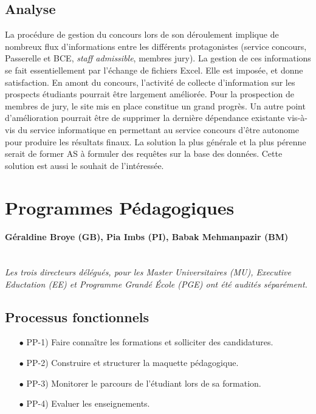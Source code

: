 \documentclass{book}
\begin{document}
\subsection{Analyse}

La procédure de gestion du concours lors de son déroulement
implique de nombreux flux d'informations entre les différents
protagonistes (service concours, Passerelle et BCE, \textit{staff 
admissible}, membres jury). La gestion de ces informations se fait
essentiellement par l'échange de fichiers Excel. Elle est imposée,
et donne satisfaction.
En amont du concours, l'activité de collecte d'information sur les
prospects étudiants pourrait être largement améliorée. Pour la
prospection de membres de jury, le site mis en place constitue un
grand progrès.
Un autre point d'amélioration pourrait être de supprimer la dernière
dépendance existante vis-à-vis du service informatique en permettant
au service concours d'être autonome pour produire les résultats finaux.
La solution la plus générale et la plus pérenne serait de former AS à 
formuler des requêtes sur la base des données. Cette solution est aussi
le souhait de l'intéressée.



\section{Programmes Pédagogiques}
\paragraph{
Géraldine Broye (GB), %
Pia Imbs (PI),
Babak Mehmanpazir (BM)} 
~\\

\textit{Les trois directeurs délégués, pour les Master Universitaires (MU), 
Executive Eductation (EE) et Programme Grandé \'Ecole (PGE) ont été audités 
séparément.}

\subsection{Processus fonctionnels}
\label{sc:pp-process}

\begin{itemize}
\item[$\bullet$] PP-1) Faire connaître les formations et solliciter des candidatures.
\item[$\bullet$] PP-2) Construire et structurer la maquette pédagogique.
\item[$\bullet$] PP-3) Monitorer le parcours de l'étudiant lors de sa formation.
\item[$\bullet$] PP-4) Evaluer les enseignements. 
\end{itemize}
\bigskip
\end{document}
